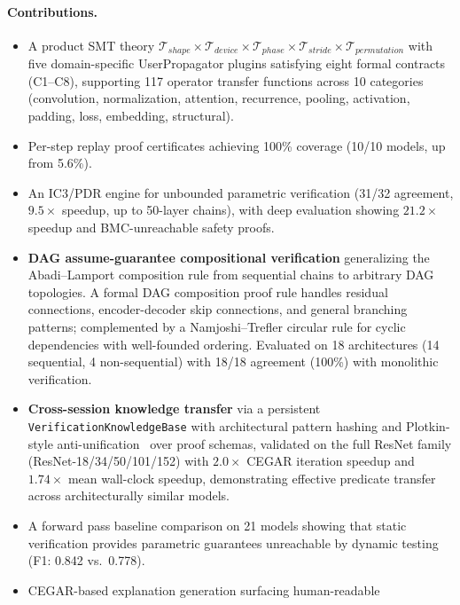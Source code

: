 \documentclass[11pt]{article}
\begin{document}
\paragraph{Contributions.}
\begin{itemize}[leftmargin=2em]
  \item A product SMT theory
    $\mathcal{T}_{\mathit{shape}} \times \mathcal{T}_{\mathit{device}}
    \times \mathcal{T}_{\mathit{phase}} \times \mathcal{T}_{\mathit{stride}}
    \times \mathcal{T}_{\mathit{permutation}}$ with five domain-specific
    UserPropagator plugins satisfying eight formal contracts (C1--C8),
    supporting 117 operator transfer functions across 10 categories
    (convolution, normalization, attention, recurrence, pooling,
    activation, padding, loss, embedding, structural).
  \item Per-step replay proof certificates achieving 100\% coverage
    (10/10 models, up from 5.6\%).
  \item An IC3/PDR engine for unbounded parametric verification
    (31/32 agreement, $9.5\times$ speedup, up to 50-layer chains),
    with deep evaluation showing $21.2\times$ speedup and
    BMC-unreachable safety proofs.
  \item \textbf{DAG assume-guarantee compositional verification}
    generalizing the Abadi--Lamport composition rule from sequential
    chains to arbitrary DAG topologies.  A formal DAG composition proof
    rule handles residual connections, encoder-decoder skip connections,
    and general branching patterns; complemented by a Namjoshi--Trefler
    circular rule for cyclic dependencies with well-founded ordering.
    Evaluated on
    18 architectures (14 sequential, 4 non-sequential) with 18/18
    agreement (100\%) with monolithic verification.
  \item \textbf{Cross-session knowledge transfer} via a persistent
    \texttt{VerificationKnowledgeBase} with architectural pattern hashing
    and Plotkin-style anti-unification~\cite{plotkin70} over proof schemas,
    validated on the full ResNet family (ResNet-18/34/50/101/152) with
    $2.0\times$ CEGAR iteration speedup and $1.74\times$ mean wall-clock
    speedup, demonstrating effective predicate transfer across
    architecturally similar models.
  \item A forward pass baseline comparison on 21 models showing that
    static verification provides parametric guarantees unreachable by
    dynamic testing (F1: 0.842 vs.\ 0.778).
  \item CEGAR-based explanation generation surfacing human-readable

\end{itemize}
\end{document}
